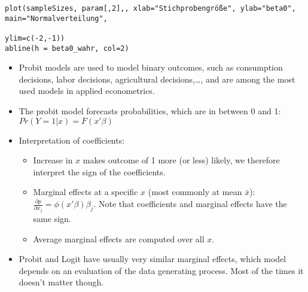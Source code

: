 \begin{Solution}{12.6}
\begin{verbatim}
plot(sampleSizes, param[,2],, xlab="Stichprobengröße", ylab="beta0", main="Normalverteilung",
                                                                                ylim=c(-2,-1))
abline(h = beta0_wahr, col=2)
\end{verbatim}
\begin{itemize}
  \item Probit models are used to model binary outcomes, such as consumption decisions, labor decisions, agricultural decisions,\dots, and are among the most used models in applied econometrics.
  \item The probit model forecasts probabilities, which are in between 0 and 1: $Pr(Y=1|x)=F(x'\beta)$
  \item Interpretation of coefficients:
  \begin{itemize}
    \item Increase in $x$ makes outcome of 1 more (or less) likely, we therefore interpret the sign of the coefficients.
    \item Marginal effects at a specific $x$ (most commonly at mean $\bar{x}$): $\frac{\partial p}{\partial x_j} = \phi(x'\beta)\beta_j$. Note that coefficients and marginal effects have the same sign.
    \item Average marginal effects are computed over all $x$.
  \end{itemize}
  \item Probit and Logit have usually very similar marginal effects, which model depends on an evaluation of the data generating process. Most of the times it doesn't matter though.
\end{itemize}
\end{Solution}
